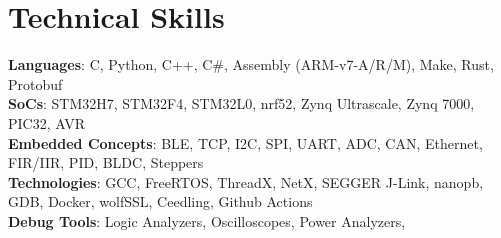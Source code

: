 \documentclass[letterpaper,10pt]{article}
\begin{document}
\section{Technical Skills}
 \begin{itemize}[leftmargin=0.15in, label={}]
    \small{\item{
     \textbf{Languages}{: C, Python, C++, C\#, Assembly (ARM-v7-A/R/M), Make, Rust, Protobuf} \\
     \textbf{SoCs}{: STM32H7, STM32F4, STM32L0, nrf52, Zynq Ultrascale, Zynq 7000, PIC32, AVR} \\
     \textbf{Embedded Concepts}{: BLE, TCP, I2C, SPI, UART, ADC, CAN, Ethernet, FIR/IIR, PID, BLDC, Steppers } \\
     \textbf{Technologies}{: GCC, FreeRTOS, ThreadX, NetX, SEGGER J-Link, nanopb, GDB, Docker, wolfSSL, Ceedling, Github Actions} \\
     \textbf{Debug Tools}{: Logic Analyzers, Oscilloscopes, Power Analyzers, }
    }}
 \end{itemize}

\end{document}
